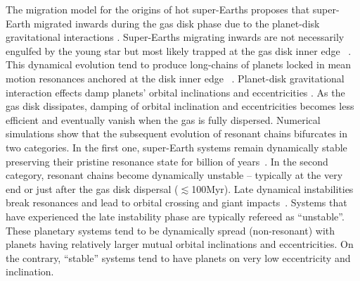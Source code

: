 \documentclass[fleqn,usenatbib]{mnras}
\begin{document}
The migration model for the origins of hot super-Earths proposes that super-Earth migrated inwards during the gas disk phase due to the planet-disk gravitational interactions \citep[][]{terquempapaloizou07,raymond08,mcneilnelson10,idalin10}. Super-Earths  migrating inwards are not necessarily engulfed by the young star but most likely trapped at the gas disk inner edge ~\citep{massetetal06,romanovalovelace06,flocketal19}. This dynamical evolution tend to produce long-chains of planets locked in  mean motion resonances  anchored at the disk inner edge ~\citep{ogiharaida09,cossouetal14,izidoro2017breaking,ogiharaetal18,lambrechtsetal19,izidoro2019formation,carreraetal19}. Planet-disk gravitational interaction effects damp planets' orbital inclinations and eccentricities \citep{cresswell2008three,bitschkley10,bitschkley11,fendykenelson14}. As the gas disk dissipates, damping of orbital inclination and eccentricities becomes less efficient and eventually vanish when the gas is fully dispersed. Numerical simulations show that the subsequent evolution of resonant chains bifurcates in two categories. In the first one, super-Earth systems remain dynamically stable preserving their pristine resonance state for billion of years~\citep{estevesetal20}. In the second category, resonant chains become  dynamically unstable -- typically at the very end or just after the gas disk dispersal ($\lesssim$100Myr). Late dynamical instabilities break resonances and lead to orbital crossing and giant impacts~\citep{izidoro2017breaking,izidoro2019formation}. Systems that have experienced the late instability phase are typically refereed as ``unstable''. These planetary systems tend to be dynamically spread (non-resonant) with planets having relatively larger mutual orbital inclinations and eccentricities. On the contrary,  ``stable'' systems tend to have planets on very low eccentricity and inclination. 
\end{document}
